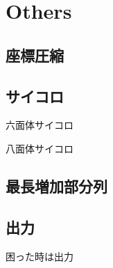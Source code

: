 \section{Others}

\subsection{座標圧縮}


\subsection{サイコロ}
六面体サイコロ

八面体サイコロ


\subsection{最長増加部分列}


\subsection{出力}
困った時は出力

